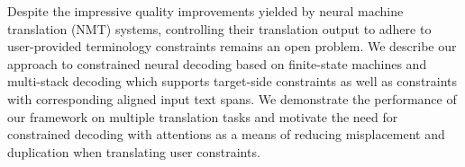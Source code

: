 Despite the impressive quality improvements yielded by neural machine translation (NMT) systems, controlling their translation output to adhere to user-provided terminology constraints remains an open problem. We describe our approach to constrained neural decoding based on finite-state machines and multi-stack decoding which supports target-side constraints as well as constraints with corresponding aligned input text spans. We demonstrate the performance of our framework on multiple translation tasks and motivate the need for constrained decoding with attentions as a means of reducing misplacement and duplication when translating user constraints.
